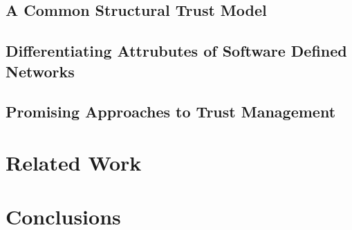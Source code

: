 \documentclass[10pt,letterpaper,twocolumn]{article}
\begin{document}
\subsection{A Common Structural Trust Model}

\subsection{Differentiating Attrubutes of Software Defined Networks}

\subsection{Promising Approaches to Trust Management}

\section{Related Work}

\section{Conclusions}

\printbibliography
\end{document}
